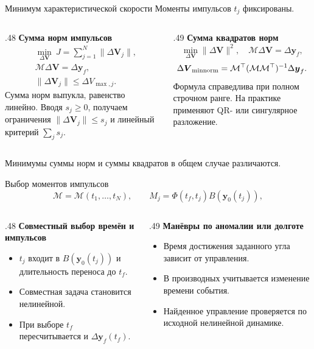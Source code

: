 \documentclass[11pt,aspectratio=169,t]{beamer}
\newcommand{\eqcompact}{\fontsize{10}{12}\selectfont}
\newcommand{\derivationmathspacing}{%
  \setlength{\abovedisplayskip}{2pt}%
  \setlength{\belowdisplayskip}{3pt}%
  \setlength{\abovedisplayshortskip}{2pt}%
  \setlength{\belowdisplayshortskip}{2pt}%
  \setlength{\jot}{2pt}}
\newcommand{\vect}[1]{\boldsymbol{#1}}
\begin{document}
\begin{frame}{Минимум характеристической скорости}
\relax
\derivationmathspacing
Моменты импульсов $t_j$ фиксированы.
\begin{columns}[T,onlytextwidth]
\begin{column}{.48\textwidth}
\textbf{Сумма норм импульсов}
{\eqcompact\derivationmathspacing
\[
 \begin{aligned}
 &\min_{\Delta\vect V}\ J=\sum_{j=1}^N\|\Delta\vect V_j\|,\\
 &\mathcal M\Delta\vect V=\Delta\vect y_f,\\
 &\|\Delta\vect V_j\|\le\Delta V_{\max,j}.
 \end{aligned}
\]
}
Сумма норм выпукла, равенство линейно. Вводя $s_j\ge0$, получаем ограничения $\|\Delta\vect V_j\|\le s_j$ и линейный критерий $\sum_j s_j$.
\end{column}
\begin{column}{.49\textwidth}
\textbf{Сумма квадратов норм}
{\eqcompact\derivationmathspacing
\[
 \min_{\Delta\vect V}\|\Delta\vect V\|^2,\quad
 \mathcal M\Delta\vect V=\Delta\vect y_f,
\]
\[
 \Delta\vect V_{\rm minnorm}
  =\mathcal M^\top(\mathcal M\mathcal M^\top)^{-1}
       \Delta\vect y_f.
\]
}
Формула справедлива при полном строчном ранге. На практике применяют QR- или сингулярное разложение.
\end{column}
\end{columns}
\smallskip
Минимумы суммы норм и суммы квадратов в общем случае различаются.
\end{frame}

\begin{frame}{Выбор моментов импульсов}
\relax
\derivationmathspacing
{\eqcompact\derivationmathspacing
\[
 \mathcal M=\mathcal M(t_1,\ldots,t_N),\qquad
 M_j=\Phi(t_f,t_j)B(\vect y_0(t_j)),
\]
}
\begin{columns}[T,onlytextwidth]
\begin{column}{.48\textwidth}
\textbf{Совместный выбор времён и импульсов}
\begin{itemize}
\setlength{\itemsep}{5pt}
\item $t_j$ входит в $B(\vect y_0(t_j))$ и длительность переноса до $t_f$.
\item Совместная задача становится нелинейной.
\item При выборе $t_f$ пересчитывается и $\Delta\vect y_f(t_f)$.
\end{itemize}
\end{column}
\begin{column}{.49\textwidth}
\textbf{Манёвры по аномалии или долготе}
\begin{itemize}
\setlength{\itemsep}{5pt}
\item Время достижения заданного угла зависит от управления.
\item В производных учитывается изменение времени события.
\item Найденное управление проверяется по исходной нелинейной динамике.
\end{itemize}
\end{column}
\end{columns}
\end{frame}
\end{document}
